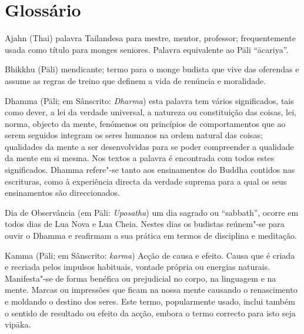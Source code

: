 \chapter{Glossário}

\begin{glossarydescription}


\item[Ajahn] (Thai) palavra Tailandesa para mestre, mentor, professor;
  frequentemente usada como título para monges seniores. Palavra equivalente ao
  Pāli “ācariya”.


\item[Bhikkhu] (Pāli) mendicante; termo para o monge budista que vive das
  oferendas e assume as regras de treino que definem a vida de renúncia e
  moralidade.



\item[Dhamma] (Pāli; em Sânscrito: \emph{Dharma}) esta palavra tem vários
  significados, tais como dever, a lei da verdade universal, a natureza ou
  constituição das coisas, lei, norma, objecto da mente, fenómenos ou princípios
  de comportamentos que ao serem seguidos integram os seres humanos na ordem
  natural das coisas; qualidades da mente a ser desenvolvidas para se poder
  compreender a qualidade da mente em si mesma. Nos textos a palavra é
  encontrada com todos estes significados. Dhamma refere"-se tanto aos
  ensinamentos do Buddha contidos nas escrituras, como à experiência directa da
  verdade suprema para a qual os seus ensinamentos são direccionados.

\item[Dia de Observância] (em Pāli: \emph{Uposatha}) um dia sagrado ou
  “sabbath”, ocorre em todos dias de Lua Nova e Lua Cheia. Nestes dias os
  budistas reúnem"-se para ouvir o Dhamma e reafirmam a sua prática em termos de
  disciplina e meditação.








\item[Kamma] (Pāli; em Sânscrito: \emph{karma}) Acção de causa e efeito. Causa que é
  criada e recriada pelos impulsos habituais, vontade própria ou energias
  naturais. Manifesta"-se de forma benéfica ou prejudicial no corpo, na linguagem
  e na mente. Marcas ou impressões que ficam na nossa mente causando o
  renascimento e moldando o destino dos seres. Este termo, popularmente usado,
  inclui também o sentido de resultado ou efeito da acção, embora o termo
  correcto para isto seja vipāka.


\end{glossarydescription}
